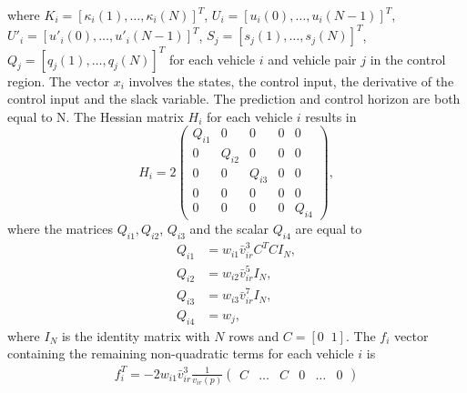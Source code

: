 \documentclass[letterpaper,10pt,conference]{ieeeconf}
\newcommand{\red}[1]{\textcolor{red}{#1}}  %
\begin{document}
where $K_i=[\kappa_i(1),\ldots,\kappa_i(N)]^T$, $U_i=[u_i(0),\ldots,u_i(N-1)]^T$, $U'_i=[u'_i(0),\ldots,u'_i(N-1)]^T$, $S_j=[s_j(1),\ldots,s_j(N)]^T$, $Q_j=[q_j(1),\ldots,q_j(N)]^T$ for each vehicle $i$ and vehicle pair $j$ in the control region.
The vector $x_i$ involves the states, the control input, the derivative of the control input and the slack variable. The prediction and control horizon are both equal to N. The Hessian matrix $H_i$ for each vehicle $i$ results in
\begin{equation}\label{eq:hessian}
H_i = 2
\begin{pmatrix}
    Q_{i1} & 0 & 0 & 0 & 0 \\
    0 & Q_{i2} & 0 & 0 & 0 \\
    0 & 0 & Q_{i3} & 0 & 0 \\
    0 & 0 & 0 & 0 & 0  \\
    0 & 0 & 0 & 0 & Q_{i4}
\end{pmatrix},
\end{equation}
where the matrices $Q_{i1}, Q_{i2}$, $Q_{i3}$ and the scalar $Q_{i4}$ are equal to
\begin{subequations}
\begin{align}
Q_{i1} &= w_{i1}\bar{v}_{ir}^3 C^TC I_N, \\
Q_{i2} &=  w_{i2}\bar{v}_{ir}^5I_N ,\\
Q_{i3} &= w_{i3}\bar{v}_{ir}^7I_N, \\
Q_{i4} &= w_j,
\end{align}
\end{subequations}
where $I_N$ is the identity matrix with $N$ rows and $C=[0 \;\; 1]$.
The $f_i$ vector containing the remaining non-quadratic terms for each vehicle $i$ is
\begin{align}
f_i^T =-2w_{i1}\bar{v}_{ir}^3\frac{1}{v_{ir}(p)} \begin{pmatrix} C & \hdots & C & 0 &\hdots & 0 \end{pmatrix}
\end{align}

\end{document}
